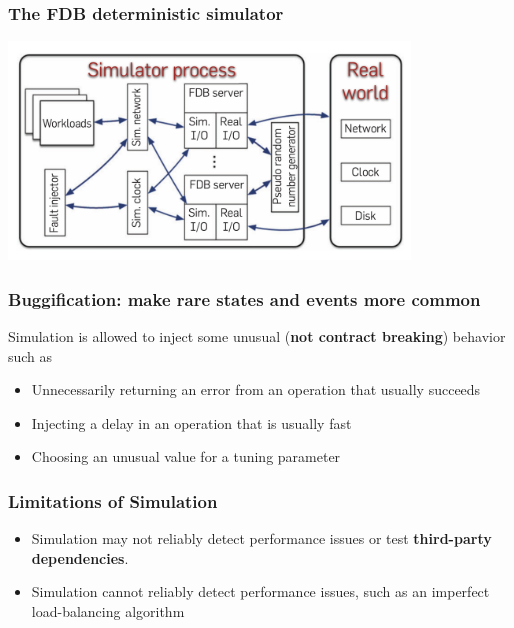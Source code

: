 
\begin{frame}
    \frametitle{The FDB deterministic simulator}
    \begin{center}
        \includegraphics[width=0.8\textwidth]{img/3-Testing/The FDB deterministic simulator.png}
    \end{center}
    
\end{frame}


\begin{frame}
    \frametitle{Buggification: make rare states and events more common}
    Simulation is allowed to inject some unusual (\textbf{not contract breaking}) behavior such as 
    \begin{itemize}
        \item Unnecessarily returning an error from an operation that usually succeeds
        \item Injecting a delay in an operation that is usually fast
        \item Choosing an unusual value for a tuning parameter
    \end{itemize}
\end{frame}
\begin{frame}
    \frametitle{Limitations of Simulation}
    \begin{itemize}
        \item Simulation may not reliably detect performance issues or test \textbf{third-party dependencies}.
        \item Simulation cannot reliably detect performance issues, such as an imperfect load-balancing algorithm
    \end{itemize}
\end{frame}